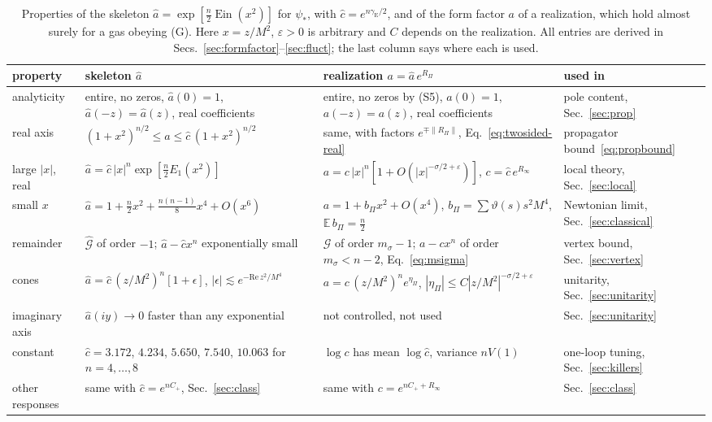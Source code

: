 \documentclass[a4paper,11pt]{article}
\newcommand{\bE}{\mathbb{E}}
\newcommand{\Ein}{\operatorname{Ein}}
\newcommand{\gE}{\gamma_{\mathrm E}}
\begin{document}
\begin{table}[t]
\centering
\small\begin{adjustbox}{max width=\linewidth}\begin{tabular}{p{2.2cm}p{5.9cm}p{5.6cm}p{3.3cm}}
property & skeleton $\hat a$ & realization $a=\hat a\,e^{R_\Pi}$ & used in\\
\hline
analyticity & entire, no zeros, $\hat a(0)=1$, $\hat a(-z)=\hat a(z)$, real coefficients & entire, no zeros by (S5), $a(0)=1$, $a(-z)=a(z)$, real coefficients & pole content, Sec.~\ref{sec:prop}\\
real axis & $(1+x^2)^{n/2}\le\hat a\le\hat c\,(1+x^2)^{n/2}$ & same, with factors $e^{\mp\|R_\Pi\|}$, Eq.~\eqref{eq:twosided-real} & propagator bound~\eqref{eq:propbound}\\
large $|x|$, real & $\hat a=\hat c\,|x|^n\exp[\frac n2E_1(x^2)]$ & $a=c\,|x|^n[1+O(|x|^{-\sigma/2+\varepsilon})]$, $c=\hat c\,e^{R_\infty}$ & local theory, Sec.~\ref{sec:local}\\
small $x$ & $\hat a=1+\frac n2x^2+\frac{n(n-1)}8x^4+O(x^6)$ & $a=1+b_\Pi x^2+O(x^4)$, $b_\Pi=\sum\vartheta(s)s^2M^4$, $\bE\,b_\Pi=\frac n2$ & Newtonian limit, Sec.~\ref{sec:classical}\\
remainder & $\hat{\mathcal G}$ of order $-1$; $\hat a-\hat cx^n$ exponentially small & $\mathcal G$ of order $m_\sigma-1$; $a-cx^n$ of order $m_\sigma<n-2$, Eq.~\eqref{eq:msigma} & vertex bound, Sec.~\ref{sec:vertex}\\
cones & $\hat a=\hat c\,(z/M^2)^n[1+\epsilon]$, $|\epsilon|\lesssim e^{-\mathrm{Re}\,z^2/M^4}$ & $a=c\,(z/M^2)^ne^{\eta_\Pi}$, $|\eta_\Pi|\le C|z/M^2|^{-\sigma/2+\varepsilon}$ & unitarity, Sec.~\ref{sec:unitarity}\\
imaginary axis & $\hat a(iy)\to0$ faster than any exponential & not controlled, not used & Sec.~\ref{sec:unitarity}\\
constant & $\hat c=3.172$, $4.234$, $5.650$, $7.540$, $10.063$ for $n=4,\dots,8$ & $\log c$ has mean $\log\hat c$, variance $nV(1)$ & one-loop tuning, Sec.~\ref{sec:killers}\\
other responses & same with $\hat c=e^{nC_+}$, Sec.~\ref{sec:class} & same with $c=e^{nC_++R_\infty}$ & Sec.~\ref{sec:class}\\
\hline\hline
\end{tabular}\end{adjustbox}
\caption{Properties of the skeleton $\hat a=\exp[\frac n2\Ein(x^2)]$ for $\psi_*$, with $\hat c=e^{n\gE/2}$, and of the form factor $a$ of a realization, which hold almost surely for a gas obeying (G). Here $x=z/M^2$, $\varepsilon>0$ is arbitrary and $C$ depends on the realization. All entries are derived in Secs.~\ref{sec:formfactor}--\ref{sec:fluct}; the last column says where each is used.}
\label{tab:a}
\end{table}
\end{document}
